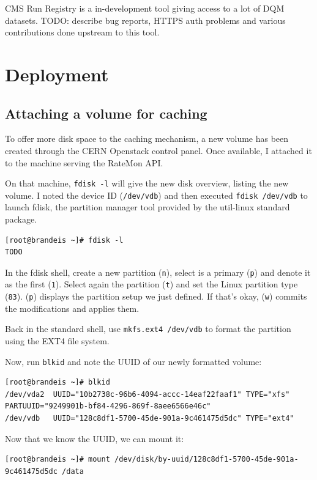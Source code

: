 CMS Run Registry is a in-development tool giving access to a lot of DQM datasets. TODO: describe bug reports, HTTPS auth problems and various contributions done upstream to this tool.


\section{Deployment}

\subsection{Attaching a volume for caching}

To offer more disk space to the caching mechanism, a new volume has been created through the CERN Openstack control panel. Once available, I attached it to the machine serving the RateMon API.

On that machine, \texttt{fdisk -l} will give the new disk overview, listing the new volume. I noted the device ID (\texttt{/dev/vdb}) and then executed \texttt{fdisk /dev/vdb} to launch fdisk, the partition manager tool provided by the util-linux standard package.

\begin{verbatim}
[root@brandeis ~]# fdisk -l
TODO
\end{verbatim}

In the fdisk shell, create a new partition (\texttt{n}), select is a primary (\texttt{p}) and denote it as the first (\texttt{1}). Select again the partition (\texttt{t}) and set the Linux partition type (\texttt{83}). (\texttt{p}) displays the partition setup we just defined. If that's okay, (\texttt{w}) commits the modifications and applies them.

Back in the standard shell, use \texttt{mkfs.ext4 /dev/vdb} to format the partition using the EXT4 file system.

Now, run \texttt{blkid} and note the UUID of our newly formatted volume:

\begin{verbatim}
[root@brandeis ~]# blkid
/dev/vda2  UUID="10b2738c-96b6-4094-accc-14eaf22faaf1" TYPE="xfs" PARTUUID="9249901b-bf84-4296-869f-8aee6566e46c" 
/dev/vdb   UUID="128c8df1-5700-45de-901a-9c461475d5dc" TYPE="ext4"
\end{verbatim}

Now that we know the UUID, we can mount it:

\begin{verbatim}
[root@brandeis ~]# mount /dev/disk/by-uuid/128c8df1-5700-45de-901a-9c461475d5dc /data
\end{verbatim}

